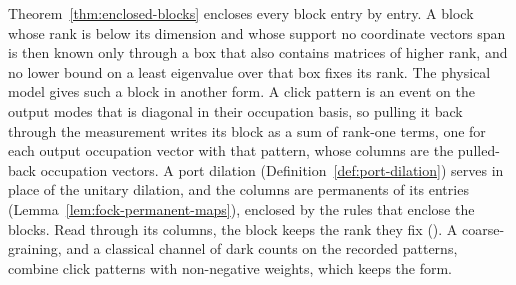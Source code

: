 
Theorem~\ref{thm:enclosed-blocks} encloses every block entry by entry. A block
whose rank is below its dimension and whose support no coordinate vectors
span is then known only through a box that also contains matrices of higher
rank, and no lower bound on a least eigenvalue over that box fixes its rank.
The physical model gives such a block in another form. A click pattern is an
event on the output modes that is diagonal in their occupation basis, so
pulling it back through the measurement writes its block as a sum of
rank-one terms, one for each output occupation vector with that pattern,
whose columns are the pulled-back occupation vectors. A port dilation
(Definition~\ref{def:port-dilation}) serves in place of the unitary dilation,
and the columns are permanents of its entries
(Lemma~\ref{lem:fock-permanent-maps}), enclosed by the rules that enclose the
blocks. Read through its columns, the block keeps the rank they fix
(). A coarse-graining, and
a classical channel of dark counts on the recorded patterns, combine click
patterns with non-negative weights, which keeps the form.

